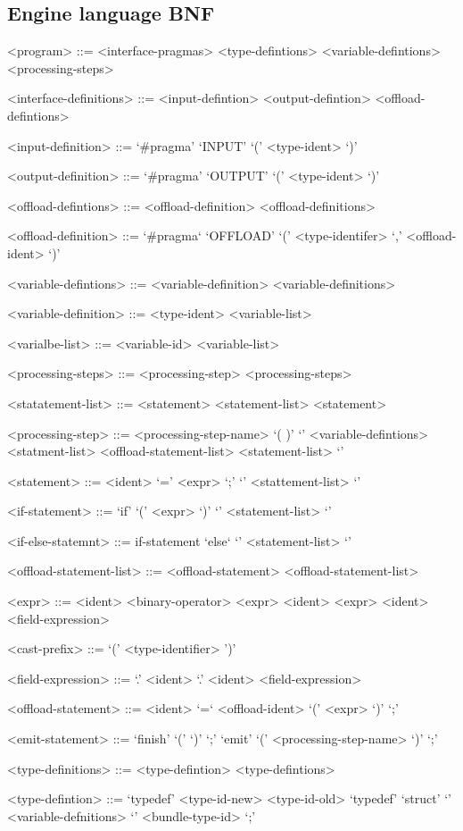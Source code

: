 \documentclass[a4paper, 12pt]{report}
\begin{document}
\subsection{Engine language BNF}
\begin{grammar}
<program> ::= <interface-pragmas> <type-defintions> 
<variable-defintions> <processing-steps> 

<interface-definitions> ::= <input-defintion> 
<output-defintion> <offload-defintions>

<input-definition> ::= `#pragma' `INPUT' `(' 
<type-ident> `)'

<output-definition> ::= `#pragma' `OUTPUT' `(' 
<type-ident> `)'

<offload-defintions> ::= <offload-definition> 
<offload-definitions>

<offload-definition> ::= `#pragma` `OFFLOAD' `(' 
<type-identifer> `,' <offload-ident> `)'

<variable-defintions> ::= <variable-definition> 
<variable-definitions>

<variable-definition> ::= <type-ident> <variable-list>

<varialbe-list> ::= <variable-id> <variable-list>

<processing-steps> ::= <processing-step> 
 <processing-steps>

<statatement-list> ::= <statement> <statement-list> 
\alt <statement> 

<processing-step> ::= <processing-step-name> `( )' `{' 
<variable-defintions> <statment-list> 
<offload-statement-list> <statement-list> `}'

<statement> ::= <ident> `=' <expr> `;' 
\alt `{' <stattement-list> `}' 

<if-statement> ::= `if' `(' <expr> `)' `{' 
<statement-list> `}'   

<if-else-statemnt> ::= if-statement `else` `{' 
<statement-list> `}'

<offload-statement-list> ::= <offload-statement> 
<offload-statement-list> 

<expr> ::= <ident> <binary-operator> <expr>
\alt <ident>
 <expr> 
\alt <ident> <field-expression>

<cast-prefix> ::= `(' <type-identifier> ')'

<field-expression> ::= `.' <ident> 
\alt `.' <ident> <field-expression>

<offload-statement> ::= <ident> `=` <offload-ident> `(' 
<expr> `)' `;'

<emit-statement> ::= `finish' `(' `)' `;'
\alt `emit' `(' <processing-step-name> `)' `;'

<type-definitions> ::= <type-defintion> 
<type-defintions>

<type-defintion> ::= `typedef' <type-id-new> 
<type-id-old>
\alt `typedef' `struct' `{' <variable-defnitions> `}' 
<bundle-type-id> `;'

\end{grammar}
\end{document}
